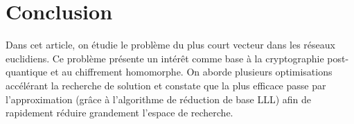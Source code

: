 \documentclass{article}
\begin{document}
\section{Conclusion}

Dans cet article, on étudie le problème du plus court vecteur dans les réseaux euclidiens. Ce problème présente un intérêt comme base à la cryptographie post-quantique et au chiffrement homomorphe. On aborde plusieurs optimisations accélérant la recherche de solution et constate que la plus efficace passe par l'approximation (grâce à l'algorithme de réduction de base LLL) afin de rapidement réduire grandement l'espace de recherche.

\newpage


\end{document}
